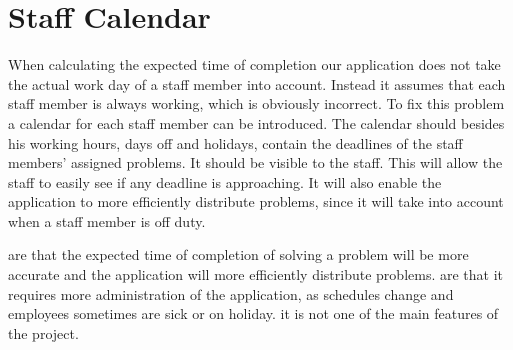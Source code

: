 \section{Staff Calendar}
\label{sec:staffCalendar}
When calculating the expected time of completion our application does not take the actual work day of a staff member into account. 
Instead it assumes that each staff member is always working, which is obviously incorrect. 
To fix this problem a calendar for each staff member can be introduced. 
The calendar should besides his working hours, days off and holidays, contain the deadlines of the staff members' assigned problems. 
It should be visible to the staff. 
This will allow the staff to easily see if any deadline is approaching. 
It will also enable the application to more efficiently distribute problems, since it will take into account when a staff member is off duty. 

 are that the expected time of completion of solving a problem will be more accurate and the application will more efficiently distribute problems.
 are that it requires more administration of the application, as schedules change and employees sometimes are sick or on holiday.
 it is not one of the main features of the project.
